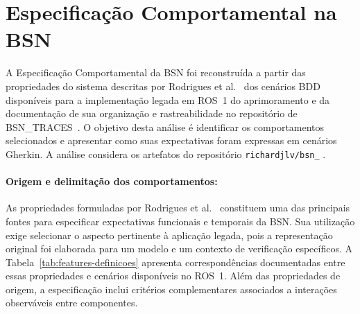 \section{Especificação Comportamental na BSN}
\label{sec:resultados-especificacao-bsn}

A  Especificação Comportamental da BSN foi reconstruída a partir das propriedades do sistema descritas por Rodrigues et al.~\cite{Rodrigues_2018} dos cenários BDD disponíveis para a implementação legada em ROS~1 do aprimoramento e da documentação de sua organização e rastreabilidade no repositório de BSN\_TRACES~\cite{Viana}. O objetivo desta análise é identificar os comportamentos selecionados e apresentar como suas expectativas foram expressas em cenários Gherkin. A análise considera os artefatos do repositório \texttt{richardjlv/bsn\_} \cite{BSN_ROS1_BDD}. 

\paragraph{Origem e delimitação dos comportamentos:}

As propriedades formuladas por Rodrigues et al.~\cite{Rodrigues_2018} constituem uma das principais fontes para especificar expectativas funcionais e temporais da BSN. Sua utilização exige selecionar o aspecto pertinente à aplicação legada, pois a representação original foi elaborada para um modelo e um contexto de verificação específicos. A Tabela~\ref{tab:features-definicoes} apresenta correspondências documentadas entre essas propriedades e cenários disponíveis no ROS~1. Além das propriedades de origem, a especificação inclui critérios complementares associados a interações observáveis entre componentes.




